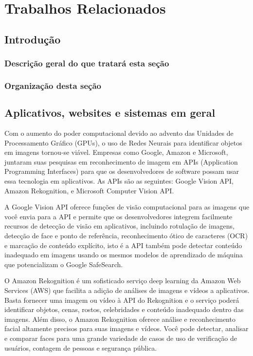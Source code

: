 \section{Trabalhos Relacionados \label{sec:trab_rel}}

\subsection*{Introdução}

\subsubsection*{Descrição geral do que tratará esta seção}
\subsubsection*{Organização desta seção}

\subsection{Aplicativos, websites e sistemas em geral \label{subsec:app_web}}

Com o aumento do poder computacional devido ao advento das Unidades de Processamento Gráfico (GPUs), o uso de Redes Neurais para identificar objetos em imagens tornou-se viável. 
Empresas como Google, Amazon e Microsoft, juntaram suas pesquisas em reconhecimento de imagem em APIs (Application Programming Interfaces) para que os desenvolvedores de software possam usar essa tecnologia em aplicativos. As APIs são as seguintes: Google Vision API, Amazon Rekognition, e Microsoft Computer Vision API.

A Google Vision API \cite{google_vision} oferece funções de visão computacional para as imagens que você envia para a API e permite que os desenvolvedores integrem facilmente recursos de detecção de visão em aplicativos, incluindo rotulação de imagens, detecção de face e ponto de referência, reconhecimento ótico de caracteres (OCR) e marcação de conteúdo explícito, isto é a API também pode detectar conteúdo inadequado em imagens usando os mesmos modelos de aprendizado de máquina que potencializam o Google SafeSearch. 

O Amazon Rekognition \cite{amazon_rekognition} é um sofisticado serviço deep learning da Amazon Web Services (AWS) que facilita a adição de análises de imagens e vídeos a aplicativos. Basta fornecer uma imagem ou vídeo à API do Rekognition e o serviço poderá identificar objetos, cenas, rostos, celebridades e conteúdo inadequado dentro das imagens. Além disso, o Amazon Rekognition oferece análise e reconhecimento facial altamente precisos para suas imagens e vídeos. Você pode detectar, analisar e comparar faces para uma grande variedade de casos de uso de verificação de usuários, contagem de pessoas e segurança pública.

